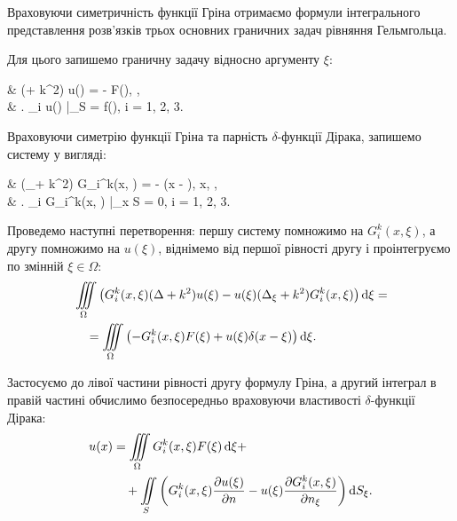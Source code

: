 Враховуючи симетричність функції Гріна отримаємо формули інтегрального представлення розв'язків трьох основних граничних задач рівняння Гельмгольца. \medskip

Для цього запишемо граничну задачу відносно аргументу $\xi$:
\begin{system}
	& (\Delta + k^2) u(\xi) = - F(\xi), \quad \xi \in \Omega, \\
	& \left. \ell_i u(\xi) \right|_{\xi \in S} = f(\xi), \quad i = 1, 2, 3.
\end{system}

Враховуючи симетрію функції Гріна та парність $\delta$-функції Дірака, запишемо систему у вигляді:
\begin{system}
	& (\Delta_\xi + k^2) G_i^k(x, \xi) = - \delta(x - \xi), \quad x, \xi \in \Omega, \\
	& \left.  \ell_i G_i^k(x, \xi) \right|_{x \in S} = 0, \quad i = 1, 2, 3.
\end{system}

Проведемо наступні перетворення: першу систему помножимо на $G_i^k(x, \xi)$, а другу помножимо на $u(\xi)$, віднімемо від першої рівності другу і проінтегруємо по змінній $\xi \in \Omega$:
\begin{equation}
	\begin{aligned}
		& \displaystyle\iiint\limits_\Omega \left( G_i^k(x, \xi) (\Delta + k^2) u(\xi) - u(\xi) (\Delta_\xi + k^2) G_i^k(x, \xi) \right) \mathop{}\!\mathrm{d} \xi = \\
		& \quad = \displaystyle\iiint\limits_\Omega \left( - G_i^k(x, \xi) F(\xi) + u(\xi) \delta(x - \xi) \right) \mathop{}\!\mathrm{d} \xi.
	\end{aligned}
\end{equation}


Застосуємо до лівої частини рівності другу формулу Гріна, а другий інтеграл в правій частині обчислимо безпосередньо враховуючи властивості $\delta$-функції Дірака:
\begin{equation}
	\begin{aligned}
		u(x) & = \displaystyle\iiint\limits_\Omega G_i^k(x, \xi) F(\xi) \mathop{}\!\mathrm{d} \xi + \\
		& \quad + \displaystyle\iint\limits_S \left( G_i^k(x, \xi) \frac{\partial u(\xi)}{\partial n} - u(\xi) \frac{\partial G_i^k(x, \xi)}{\partial n_\xi} \right) \mathop{}\!\mathrm{d} S_\xi.
	\end{aligned}
\end{equation}

